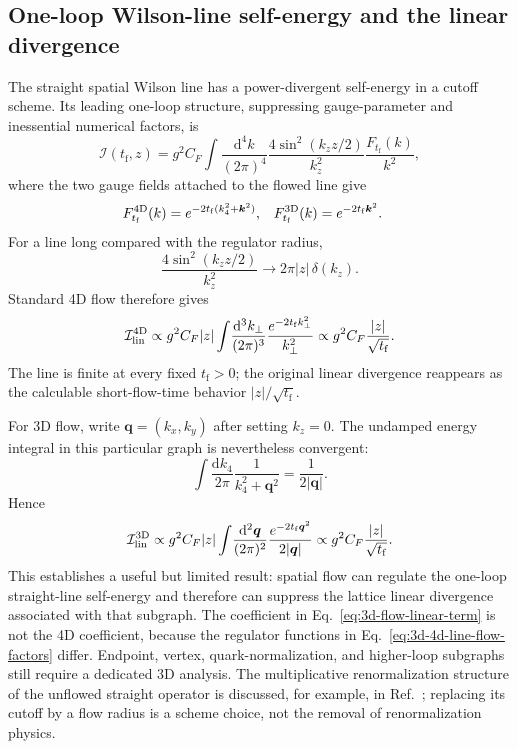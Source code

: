 \documentclass[11pt]{article}
\numberwithin{equation}{section}
\newcommand{\dd}{\mathrm{d}}
\newcommand{\tf}{t_{\mathrm f}}
\begin{document}
\subsection{One-loop Wilson-line self-energy and the linear divergence}

The straight spatial Wilson line has a power-divergent self-energy in a cutoff
scheme.  Its leading one-loop structure, suppressing gauge-parameter and
inessential numerical factors, is
\begin{equation}
  \mathcal I(\tf,z)
  =g^2C_F
  \int\!\frac{\dd^4k}{(2\pi)^4}
  \frac{4\sin^2(k_z z/2)}{k_z^2}
  \frac{F_{\tf}(k)}{k^2},
  \label{eq:wilson-line-self-energy}
\end{equation}
where the two gauge fields attached to the flowed line give
\begin{align}
  F_{\tf}^{\rm 4D}(k)
  &=e^{-2\tf(k_4^2+\bm k^2)},
  &
  F_{\tf}^{\rm 3D}(k)
  &=e^{-2\tf\bm k^2}.
  \label{eq:3d-4d-line-flow-factors}
\end{align}
For a line long compared with the regulator radius,
\begin{equation}
  \frac{4\sin^2(k_z z/2)}{k_z^2}
  \longrightarrow
  2\pi|z|\,\delta(k_z).
  \label{eq:long-line-delta}
\end{equation}
Standard 4D flow therefore gives
\begin{equation}
  \mathcal I_{\rm lin}^{\rm 4D}
  \propto
  g^2C_F|z|
  \int\!\frac{\dd^3k_\perp}{(2\pi)^3}
  \frac{e^{-2\tf k_\perp^2}}{k_\perp^2}
  \propto
  g^2C_F\frac{|z|}{\sqrt{\tf}}.
  \label{eq:4d-flow-linear-term}
\end{equation}
The line is finite at every fixed \(\tf>0\); the original linear divergence
reappears as the calculable short-flow-time behavior \(|z|/\sqrt{\tf}\).

For 3D flow, write \(\bm q=(k_x,k_y)\) after setting \(k_z=0\).  The undamped
energy integral in this particular graph is nevertheless convergent:
\begin{equation}
  \int\!\frac{\dd k_4}{2\pi}
  \frac{1}{k_4^2+\bm q^2}
  =\frac{1}{2|\bm q|}.
  \label{eq:3d-line-energy-integral}
\end{equation}
Hence
\begin{equation}
  \mathcal I_{\rm lin}^{\rm 3D}
  \propto
  g^2C_F|z|
  \int\!\frac{\dd^2\bm q}{(2\pi)^2}
  \frac{e^{-2\tf\bm q^2}}{2|\bm q|}
  \propto
  g^2C_F\frac{|z|}{\sqrt{\tf}}.
  \label{eq:3d-flow-linear-term}
\end{equation}
This establishes a useful but limited result: spatial flow can regulate the
one-loop straight-line self-energy and therefore can suppress the lattice
linear divergence associated with that subgraph.  The coefficient in
Eq.~\eqref{eq:3d-flow-linear-term} is not the 4D coefficient, because the
regulator functions in Eq.~\eqref{eq:3d-4d-line-flow-factors} differ.
Endpoint, vertex, quark-normalization, and higher-loop subgraphs still require
a dedicated 3D analysis.  The multiplicative renormalization structure of the
unflowed straight operator is discussed, for example, in
Ref.~\cite{Ishikawa2017}; replacing its cutoff by a flow radius is a scheme
choice, not the removal of renormalization physics.
\end{document}
